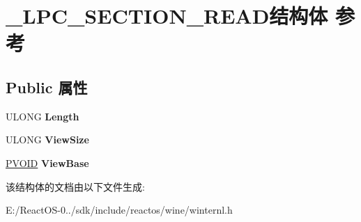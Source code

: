 \hypertarget{struct___l_p_c___s_e_c_t_i_o_n___r_e_a_d}{}\section{\+\_\+\+L\+P\+C\+\_\+\+S\+E\+C\+T\+I\+O\+N\+\_\+\+R\+E\+A\+D结构体 参考}
\label{struct___l_p_c___s_e_c_t_i_o_n___r_e_a_d}
\subsection*{Public 属性}
\begin{DoxyCompactItemize}
\item 
\mbox{\label{struct___l_p_c___s_e_c_t_i_o_n___r_e_a_d_af41b7c6c9672007e6de71bbe8539948a}} 
U\+L\+O\+NG {\bfseries Length}
\item 
\mbox{\label{struct___l_p_c___s_e_c_t_i_o_n___r_e_a_d_a9ca7be095ebb49e3f07441ce85c33fe5}} 
U\+L\+O\+NG {\bfseries View\+Size}
\item 
\mbox{\label{struct___l_p_c___s_e_c_t_i_o_n___r_e_a_d_a6d0ace2f4f70802f8f22777e9ff0434d}} 
\hyperlink{interfacevoid}{P\+V\+O\+ID} {\bfseries View\+Base}
\end{DoxyCompactItemize}


该结构体的文档由以下文件生成\+:\begin{DoxyCompactItemize}
\item 
E\+:/\+React\+O\+S-\/0../sdk/include/reactos/wine/winternl.\+h\end{DoxyCompactItemize}
